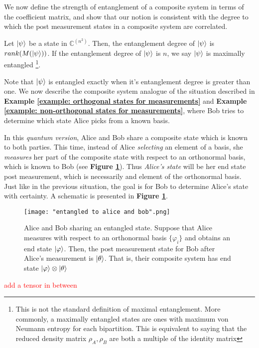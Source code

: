 We now define the strength of entanglement of a composite system in terms of the coefficient matrix, and show that our notion is consistent with the degree to which the post measurement states in a composite system are correlated.

\begin{definition} \label{def: maximally entangled}
 Let $\ket{\psi}$ be a state in ${\mathbb{C}}^{(n^2)}$.  Then, the entanglement degree of $\ket{\psi}$ is $rank(M(\ket{\psi}))$.  If the entanglement degree of $\ket{\psi}$ is $n$, we say $\ket{\psi}$ is maximally entangled \footnote{This is not the standard definition of maximal entanglement.  More commonly, a maximally entangled states are ones with maximum von Neumann entropy for each bipartition. This is equivalent to saying that the reduced density matrix $\rho_A, \rho_B$ are both a multiple of the identity matrix}.
\end{definition}


Note that $\ket{\psi}$ is entangled exactly when it's entanglement degree is greater than one.  We now describe the composite system analogue of the situation described in \textbf{Example \ref{example: orthogonal states for measurements}} and \textbf{Example \ref{example: non-orthogonal states for measurements}}, where Bob tries to determine which state Alice picks from a known basis. 

In this {\emph{quantum version}}, Alice and Bob share a composite state which is known to both parties.  This time, instead of Alice {\emph{selecting}} an element of a basis, she {\emph{measures}} her part of the composite state with respect to an orthonormal basis, which is known to Bob (see \textbf{Figure \ref{fig:entanglement}}).  Thus {\emph{Alice's state}} will be her end state post measurement, which is necessarily and element of the orthonormal basis.  Just like in the previous situation, the goal is for Bob to determine Alice's state with certainty.  A schematic is presented in \textbf{Figure \ref{fig:entanglement}}.


\begin{figure}[h]
    \centering
    \texttt{[image: "entangled to alice and bob".png]}
    \caption{Alice and Bob sharing an entangled state. Suppose that Alice measures with respect to an orthonormal basis $\{\varphi_i\}$ and obtains an end state $\ket{\varphi}$.  Then, the post measurement state for Bob after Alice's measurement is $\ket{\theta}$. That is, their composite system has end state $\ket{\varphi}\otimes\ket{\theta}$}
    \label{fig:entanglement}
\end{figure}
\textcolor{red}{add a tensor in between}


